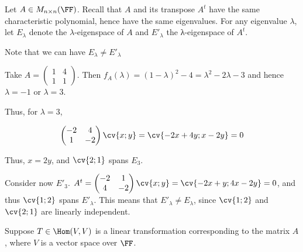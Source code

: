 \documentclass[11pt]{scrartcl}
\begin{document}
\begin{linenumbers}
  Let $A\in M_{n\times n}(\FF)$. Recall that $A$ and its transpose
  $A^{t}$ have the same characteristic polynomial, hence have the same
  eigenvalues. For any eigenvalue $\lambda$, let $E_{\lambda}$ denote the $\lambda$-eigenspace of
  $A$ and $E'_{\lambda}$ the λ-eigenspace of $A^{t}$.

  Note that we can have $E_{\lambda}\neq E'_{\lambda}$

  \begin{example*}

    Take $A =
    \begin{pmatrix}
      1 & 4 \\
      1 & 1
    \end{pmatrix}
    $. Then
    $f_A(\lambda) = (1-\lambda)^2 - 4 = \lambda^2-2\lambda - 3 $ and
    hence $\lambda = -1$ or $\lambda = 3$.

    Thus, for $\lambda = 3$,

    \begin{align}
      \begin{pmatrix}
        -2 & 4 \\
        1 & -2
      \end{pmatrix}\cv{x;y} = \cv{-2x + 4y; x - 2y} = 0
    \end{align}

    Thus, $ x = 2y$, and $\cv{2;1}$ spans $E_{3}$.

    Consider now $E'_{3}$.   $A^{t} =
    \begin{pmatrix}
      -2 & 1 \\
      4 & -2
    \end{pmatrix} \cv{x;y} = \cv{-2x + y; 4x - 2y} = 0$, and thus
    $\cv{1;2}$ spans $E'_{\lambda}$. This means that
    $E'_{\lambda} \neq E_{\lambda}$, since $\cv{1; 2}$ and $\cv{2; 1}$
    are linearly independent.
  \end{example*}

  Suppose $T \in \Hom(V,V)$ is a linear transformation corresponding
  to the matrix $A$, where $V$ is a vector space over $\FF$.


\end{linenumbers}
\end{document}
